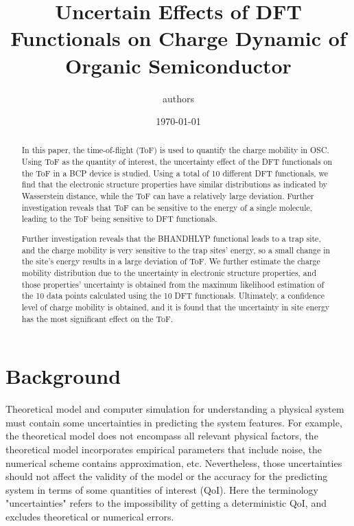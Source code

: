 \documentclass[letterpaper,12pt]{article}
\begin{document}
\linenumbers
\title{Uncertain Effects of DFT Functionals on Charge Dynamic of Organic Semiconductor }
\author{authors}
\date{\today}
\maketitle
\begin{abstract}
In this paper, the time-of-flight (ToF) is used to quantify the charge mobility in OSC. 
Using ToF as the quantity of interest, the uncertainty effect of the DFT functionals on the ToF in a BCP device is studied. 
Using a total of 10 different DFT functionals, we find that the electronic structure properties have similar distributions as indicated by Wasserstein distance, while the ToF can have a relatively large deviation.
Further investigation reveals that ToF can be sensitive to the energy of a single molecule, leading to the ToF being sensitive to DFT functionals.

Further investigation reveals that the BHANDHLYP functional leads to a trap site, and the charge mobility is very sensitive to the trap sites' energy, so a small change in the site's energy results in a large deviation of ToF.  
We further estimate the charge mobility distribution due to the uncertainty in electronic structure properties, and those properties' uncertainty is obtained from the maximum likelihood estimation of the 10 data points calculated using the 10 DFT functionals.
Ultimately, a confidence level of charge mobility is obtained, and it is found that the uncertainty in site energy has the most significant effect on the ToF. 
\end{abstract}

\section{Background}

Theoretical model and computer simulation for understanding a physical system must contain some uncertainties in predicting the system features. 
For example, the theoretical model does not encompass all relevant physical factors, the theoretical model incorporates empirical parameters that include noise, the numerical scheme contains approximation, etc.
Nevertheless, those uncertainties should not affect the validity of the model or the accuracy for the predicting system in terms of some quantities of interest (QoI). 
Here the terminology "uncertainties" refers to the impossibility of getting a deterministic QoI, and excludes theoretical or numerical errors. 
\end{document}
